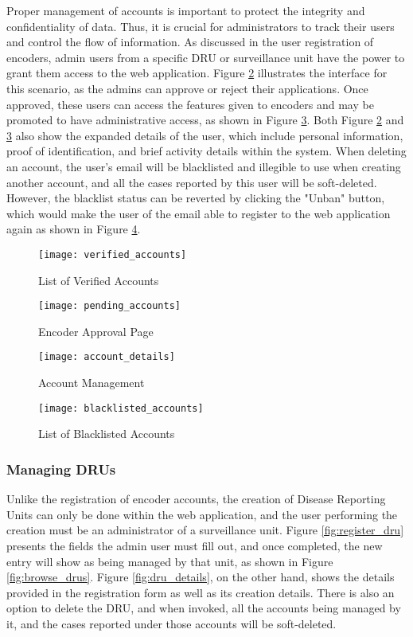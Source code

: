 Proper management of accounts is important to protect the integrity and confidentiality of data. Thus, it is crucial for administrators to track their users and control the flow of information. As discussed in the user registration of encoders, admin users from a specific DRU or surveillance unit have the power to grant them access to the web application. Figure \ref{fig:pending_accounts} illustrates the interface for this scenario, as the admins can approve or reject their applications. Once approved, these users can access the features given to encoders and may be promoted to have administrative access, as shown in Figure \ref{fig:account_details}. Both Figure \ref{fig:pending_accounts} and \ref{fig:account_details} also show the expanded details of the user, which include personal information, proof of identification, and brief activity details within the system. When deleting an account, the user's email will be blacklisted and illegible to use when creating another account, and all the cases reported by this user will be soft-deleted. However, the blacklist status can be reverted by clicking the "Unban" button, which would make the user of the email able to register to the web application again as shown in Figure \ref{fig:blacklisted_accounts}. 

\begin{figure}[H]
	\centering
	\texttt{[image: verified\_accounts]}
	\caption{List of Verified Accounts}
	\label{fig:verified_accounts}
\end{figure}
\begin{figure}[H]
	\centering
	\texttt{[image: pending\_accounts]}
	\caption{Encoder Approval Page}
	\label{fig:pending_accounts}
\end{figure}
\begin{figure}[H]
	\centering
	\texttt{[image: account\_details]}
	\caption{Account Management}
	\label{fig:account_details}
\end{figure}
\begin{figure}[H]
	\centering
	\texttt{[image: blacklisted\_accounts]}
	\caption{List of Blacklisted Accounts}
	\label{fig:blacklisted_accounts}
\end{figure}

\subsubsection{Managing DRUs}

Unlike the registration of encoder accounts, the creation of Disease Reporting Units can only be done within the web application, and the user performing the creation must be an administrator of a surveillance unit. Figure \ref{fig:register_dru} presents the fields the admin user must fill out, and once completed, the new entry will show as being managed by that unit, as shown in Figure \ref{fig:browse_drus}. Figure \ref{fig:dru_details}, on the other hand, shows the details provided in the registration form as well as its creation details. There is also an option to delete the DRU, and when invoked, all the accounts being managed by it, and the cases reported under those accounts will be soft-deleted.

